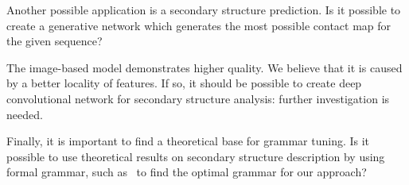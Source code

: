 \documentclass[runningheads]{llncs}
\begin{document}
Another possible application is a secondary structure prediction.
Is it possible to create a generative network which generates the most possible contact map for the given sequence?

The image-based model demonstrates higher quality.
We believe that it is caused by a better locality of features.
If so, it should be possible to create deep convolutional network for secondary structure analysis: further investigation is needed.

Finally, it is important to find a theoretical base for grammar tuning.
Is it possible to use theoretical results on secondary structure description by using formal grammar, such as~\cite{MQbioinformatics19} to find the optimal grammar for our approach?
%
%
%
% 
% 
%
\end{document}
